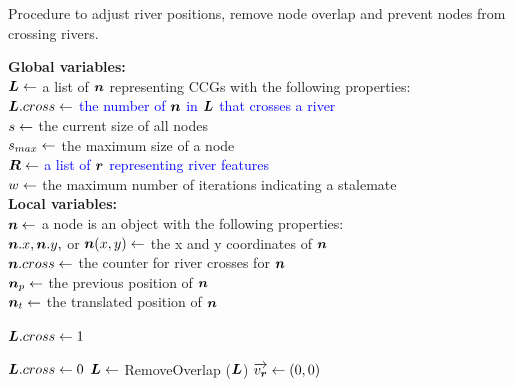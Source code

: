    \begin{algorithm}[tb!]
        \caption{Procedure to adjust river positions, remove node overlap and prevent nodes from crossing rivers.}\label{alg:UpdateLayout}
        \textbf{Global variables:} \\
        $ \bm{L} \gets $ a list of $ \bm{n} $ representing CCGs with the following properties: \\
        \-\hspace{1em}  \textcolor{blue}{$\bm{L}.cross \gets $ the number of $ \bm{n} $ in $ \bm{L} $ that crosses a river} \\
        $ s \gets $ the current size of all nodes \\
        $ s_{max} \gets $ the maximum size of a node \\
        \textcolor{blue}{ $ \bm{R} \gets $ a list of $ \bm{r} $ representing river features} \\
        $ w \gets $ the maximum number of iterations indicating a stalemate \\

        \textbf{Local variables:} \\
        $ \bm{n} \gets $ a node is an object with the following properties: \\
        \-\hspace{1em} $ \bm{n}.x, \bm{n}.y, $ or $ \bm{n}(x,y) \gets $ the x and y coordinates of $ \bm{n} $ \\
        \-\hspace{1em} $ \bm{n}.cross \gets $ the counter for river crosses for $ \bm{n} $ \\
        \-\hspace{1em} $ \bm{n}_{p} \gets $ the previous position of $ \bm{n} $ \\
        \-\hspace{1em} $ \bm{n}_t \gets $ the translated position of $ \bm{n} $ \\

        \begin{algorithmic}[1]
            \While{$ \nodeSize < \nodeSizeMax $}
                \State \textcolor{blue}{$ \bm{L}.cross \gets 1 $ }

                    \State $ \bm{L}.cross \gets 0 $
                    \State $ \bm{L} \gets $ RemoveOverlap ($ \bm{L} $)
                    \color{blue}
                    \ForEach {$ \river \in \riverList $}
                        \State $ \protect\overrightarrow{v_{\bm{r}}} \gets (0,0) $ 
                        \ForEach {$ \node \in \nodeList $}


\end{algorithmic}
\end{algorithm}
